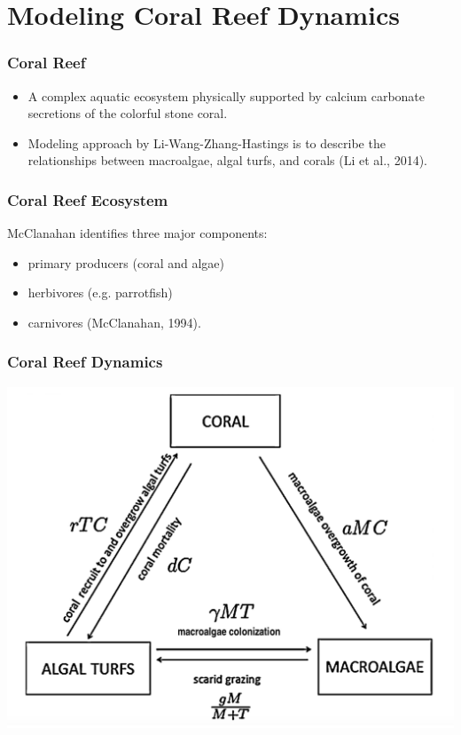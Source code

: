 \documentclass{beamer}
\begin{document}
\section{Modeling Coral Reef Dynamics}

\begin{frame}
\frametitle{Coral Reef}
\begin{itemize}
\item A complex aquatic ecosystem physically supported by calcium carbonate secretions of the colorful stone coral. \\
\item Modeling approach by Li-Wang-Zhang-Hastings is to describe the relationships between macroalgae, algal turfs, and corals (Li et al., 2014).
\end{itemize}
\end{frame}

\begin{frame}
\frametitle{Coral Reef Ecosystem} 

McClanahan identifies three major components:
\begin{itemize}
\item primary producers (coral and algae)\\
\item herbivores (e.g. parrotfish)\\
\item carnivores (McClanahan, 1994).
\end{itemize}
\end{frame}

\begin{frame}
\frametitle{Coral Reef Dynamics}
\includegraphics[scale=.175]{./coral-reef-triangle.png}
\end{frame}
\end{document}
